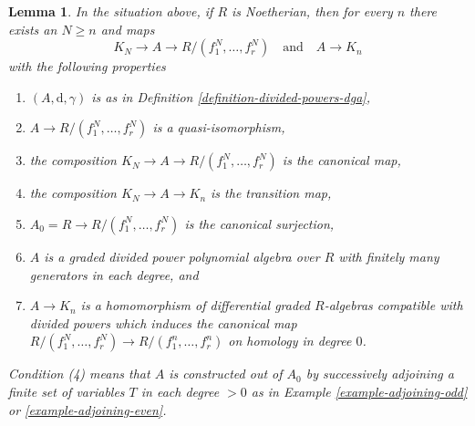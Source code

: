 \documentclass{stacks-project}
\theoremstyle{plain}
\newtheorem{lemma}[subsection]{Lemma}
\theoremstyle{definition}
\theoremstyle{remark}
\numberwithin{equation}{subsection}
\begin{document}
\begin{lemma}
\label{lemma-lift-tate-to-koszul}
In the situation above, if $R$ is Noetherian, then
for every $n$ there exists an $N \geq n$ and maps
$$
K_N \to A \to R/(f_1^N, \ldots, f_r^N)\quad\text{and}\quad A \to K_n
$$
with the following properties
\begin{enumerate}
\item $(A, \text{d}, \gamma)$ is as in
Definition \ref{definition-divided-powers-dga},
\item $A \to R/(f_1^N, \ldots, f_r^N)$ is a quasi-isomorphism,
\item the composition $K_N \to A \to R/(f_1^N, \ldots, f_r^N)$
is the canonical map,
\item the composition $K_N \to A \to K_n$ is the transition map,
\item $A_0 = R \to R/(f_1^N, \ldots, f_r^N)$ is the canonical
surjection,
\item $A$ is a graded divided power polynomial algebra over $R$
with finitely many generators in each degree, and
\item $A \to K_n$ is a homomorphism of differential graded $R$-algebras
compatible with divided powers which induces the canonical map
$R/(f_1^N, \ldots, f_r^N) \to R/(f_1^n, \ldots, f_r^n)$ on
homology in degree $0$.
\end{enumerate}
Condition (4) means that $A$ is constructed out of $A_0$ by
successively adjoining a finite set of variables $T$ in each degree
$> 0$ as in Example \ref{example-adjoining-odd} or \ref{example-adjoining-even}.
\end{lemma}
\end{document}
